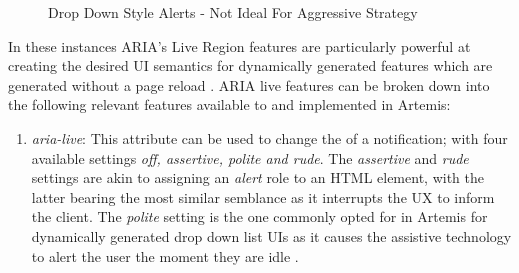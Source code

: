 \begin{enumerate}
\begin{enumerate}
\begin{figure}[H]
\begin{center}
        \caption[Drop Down Style Alerts - Not Ideal For Aggressive Strategy]{Drop Down Style Alerts - Not Ideal For Aggressive Strategy}
        \label{dropDown}
    \end{center}
    \end{figure}
    
    In these instances ARIA's Live Region features are particularly powerful at creating the desired UI semantics for dynamically generated features which are generated without a page reload \cite{MozillaDeveloperNetwork}. ARIA live features can be broken down into the following relevant features \cite{MozillaDeveloperNetwork} available to and implemented in Artemis:
    \begin{enumerate}
    \item \textit{aria-live}: This attribute can be used to change the \cite{MozillaDeveloperNetwork} of a notification; with four available settings  \textit{off, assertive, polite and rude}. The \textit{assertive} and \textit{rude} settings are akin to assigning an \textit{alert} role to an HTML element, with the latter bearing the most similar semblance as it interrupts the UX to inform the client. The \textit{polite} setting is the one commonly opted for in Artemis for dynamically generated drop down list UI\textquotesingle s as it causes the assistive technology to alert the user the moment they are idle \cite{MicrosoftDeveloperNetwork}.
    

\end{enumerate}
\end{enumerate}
\end{enumerate}
